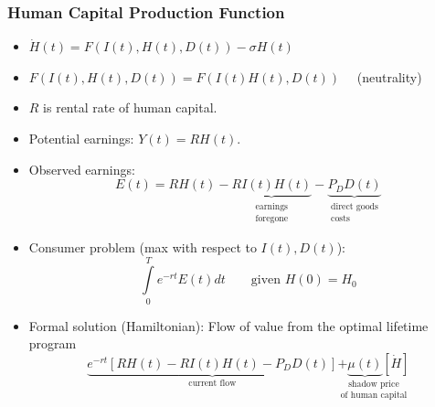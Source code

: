 \documentclass[12pt,compress,handout]{beamer}  %
\begin{document}
\begin{frame}
\frametitle{Human Capital Production Function}

\begin{itemize}[<+->]
\item $\dot{H}(t) = F(I(t),H(t),D(t)) - \sigma H(t)$

\item $F(I(t),H(t),D(t))=F(I(t)H(t),D(t)) \quad$ (neutrality)

\item $R$ is rental rate of human capital.

\item Potential earnings: $Y(t) = RH(t)$.

\item Observed earnings:
\begin{equation*}
E(t) = RH(t) - \underset{\begin{array}{c}\text{earnings}\\
\text{foregone}\end{array}}{\underbrace{RI(t)H(t)}} -
\underset{\begin{array}{c}\text{direct goods}\\
\text{costs}\end{array}}{\underbrace{P_{D}D(t)}}
\end{equation*}
\end{itemize}
\end{frame}


\begin{frame}
\begin{itemize}[<+->]
\item Consumer problem (max with respect to $I(t), D(t)$):
\begin{equation*}
\int\limits_{0}^{T}e^{-rt}E(t)dt\qquad \text{given } H(0) = H_{0}
\end{equation*}

\item Formal solution (Hamiltonian): Flow of value from the optimal lifetime
program
\begin{equation*}
\underset{\text{current
flow}}{\underbrace{e^{-rt}[RH(t)-RI(t)H(t)-P_{D}D(t)]}}\underset{\text{of human
capital}}{\underset{\text{shadow price}}{+\underbrace{\mu (t)}[\dot{H}]}}
\end{equation*}

\end{itemize}
\end{frame}
\end{document}
